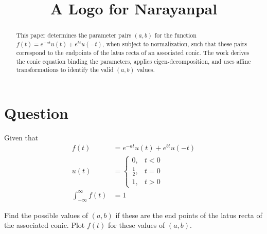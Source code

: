 \documentclass[conference]{IEEEtran}
\theoremstyle{remark}
\begin{document}
	
	\title{A Logo for Narayanpal}
	\author{
		}
	\maketitle
	
	\begin{abstract}
		This paper determines the parameter pairs $(a, b)$ for the function $f(t) = e^{-at}u(t) + e^{bt}u(-t)$, when subject to normalization, such that these pairs correspond to the endpoints of the latus recta of an associated conic. The work derives the conic equation binding the parameters, applies eigen-decomposition, and uses affine transformations to identify the valid $(a, b)$ values.
	\end{abstract}

	\section{Question}
	Given that
	\begin{align}
		f(t) &= e^{-at}u(t) + e^{bt}u(-t) \label{q1}\\
		u(t) &= \begin{cases}
			0, & t<0\\
			\frac{1}{2}, & t=0 \\
			1, & t>0
		\end{cases} \label{q2}\\
		\int_{-\infty}^{\infty} f(t) &= 1 \label{q3}
	\end{align}
	
	Find the possible values of $(a,b)$ if these are the end points of the latus recta of the associated conic. Plot $f(t)$ for these values of $(a,b)$.
	
\end{document}
